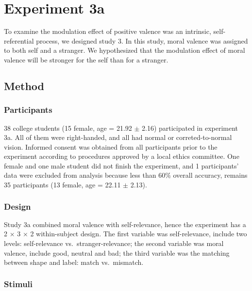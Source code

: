 \documentclass[
  english,
  man]{apa6}
\begin{document}
\hypertarget{experiment-3a}{%
\section{Experiment 3a}\label{experiment-3a}}

To examine the modulation effect of positive valence was an intrinsic, self-referential process, we designed study 3. In this study, moral valence was assigned to both self and a stranger. We hypothesized that the modulation effect of moral valence will be stronger for the self than for a stranger.

\hypertarget{method-3}{%
\subsection{Method}\label{method-3}}

\hypertarget{participants-4}{%
\subsubsection{Participants}\label{participants-4}}

38 college students (15 female, age = 21.92 \(\pm\) 2.16) participated in experiment 3a. All of them were right-handed, and all had normal or correted-to-normal vision. Informed consent was obtained from all participants prior to the experiment according to procedures approved by a local ethics committee. One female and one male student did not finish the experiment, and 1 participants' data were excluded from analysis because less than 60\% overall accuracy, remains 35 participants (13 female, age = 22.11 \(\pm\) 2.13).

\hypertarget{design}{%
\subsubsection{Design}\label{design}}

Study 3a combined moral valence with self-relevance, hence the experiment has a 2 × 3 × 2 within-subject design. The first variable was self-relevance, include two levels: self-relevance vs.~stranger-relevance; the second variable was moral valence, include good, neutral and bad; the third variable was the matching between shape and label: match vs.~mismatch.

\hypertarget{stimuli}{%
\subsubsection{Stimuli}\label{stimuli}}
\end{document}
